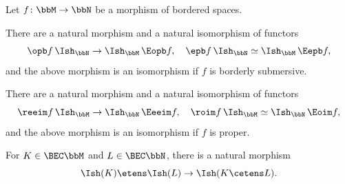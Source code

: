 \begin{lemma}\label{lem:ishop}
Let $f\colon \bbM\to \bbN$ be a morphism of bordered spaces.
\begin{enumeratei}
\item\label{lem:ishopi}
There are a natural morphism and a natural isomorphism of functors
\[
\opb f \, \Ish_{\bbN} \to \Ish_{\bbM} \, \Eopb f, \quad
\epb f \, \Ish_{\bbN} \simeq \Ish_{\bbM} \, \Eepb f,
\]
and the above morphism is an isomorphism if $f$ is borderly submersive.
\item\label{lem:ishopii}
There are a natural morphism and a natural isomorphism of functors
\[
\reeim f \, \Ish_{\bbM} \to \Ish_{\bbN} \, \Eeeim f, \quad
\roim f \, \Ish_{\bbM} \simeq \Ish_{\bbN} \, \Eoim f,
\]
and the above morphism is an isomorphism if $f$ is proper.
\item\label{lem:ishopiii}
For $K\in\BEC\bbM$ and $L\in\BEC\bbN$,
there is a natural morphism
\[
\Ish(K)\etens\Ish(L)\to\Ish(K\cetens L).
\]
\end{enumeratei}
\end{lemma}

